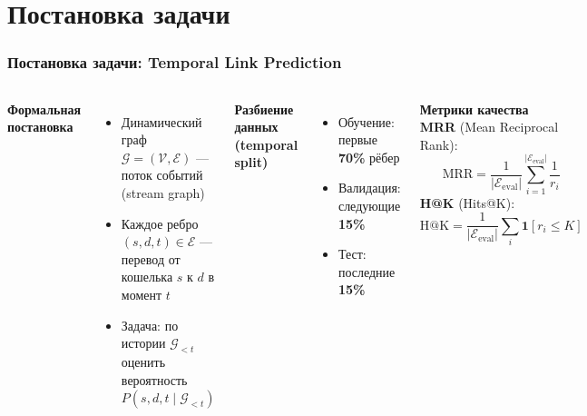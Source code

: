 \documentclass[aspectratio=169]{beamer}
\begin{document}
\section{Постановка задачи}
\begin{frame}
  \frametitle{Постановка задачи: Temporal Link Prediction}
  \begin{columns}
    \textbf{Формальная постановка}
    \begin{itemize}
      \item Динамический граф $\mathcal{G} = (\mathcal{V}, \mathcal{E})$ — поток событий (stream graph)
      \item Каждое ребро $(s, d, t) \in \mathcal{E}$ — перевод от кошелька $s$ к $d$ в момент $t$
      \item Задача: по истории $\mathcal{G}_{<t}$ оценить вероятность $P(s, d, t \mid \mathcal{G}_{<t})$
    \end{itemize}
    \vspace{0.3cm}
    \textbf{Разбиение данных (temporal split)}
    \begin{itemize}
      \item Обучение: первые \textbf{70\%} рёбер
      \item Валидация: следующие \textbf{15\%}
      \item Тест: последние \textbf{15\%}
    \end{itemize}
    \textbf{Метрики качества}\\[0.2cm]
    \textbf{MRR} (Mean Reciprocal Rank):
    $$\text{MRR} = \frac{1}{|\mathcal{E}_\text{eval}|} \sum_{i=1}^{|\mathcal{E}_\text{eval}|} \frac{1}{r_i}$$
    \textbf{H@K} (Hits@K):
    $$\text{H@K} = \frac{1}{|\mathcal{E}_\text{eval}|} \sum_{i} \mathbf{1}[r_i \le K]$$
  \end{columns}
\end{frame}

\end{document}
